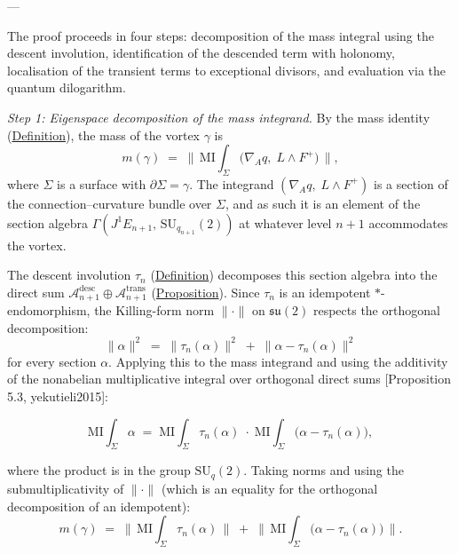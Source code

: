 \begin{theorem}
---

The proof proceeds in four steps: decomposition of the mass integral
using the descent involution, identification of the descended term with
holonomy, localisation of the transient terms to exceptional divisors,
and evaluation via the quantum dilogarithm.

\emph{Step 1: Eigenspace decomposition of the mass integrand.}
By the mass identity (\hyperref[def:mass-identity]{Definition}), the mass of
the vortex $\gamma$ is
\[
m(\gamma)
  \;=\;
  \bigl\lVert\,
  \mathrm{MI}\!\!\int_\Sigma
  \bigl(\nabla_A q,\; L \wedge F^+\bigr)
  \,\bigr\rVert,
\]
where $\Sigma$ is a surface with $\partial\Sigma = \gamma$.  The
integrand $(\nabla_A q,\; L \wedge F^+)$ is a section of the
connection--curvature bundle over $\Sigma$, and as such it is an element
of the section algebra $\Gamma(J^1 E_{n+1},\, \mathrm{SU}_{q_{n+1}}(2))$
at whatever level $n{+}1$ accommodates the vortex.

The descent involution $\tau_n$ (\hyperref[def:descent-involution]{Definition})
decomposes this section algebra into the direct sum
$\mathcal{A}_{n+1}^{\mathrm{desc}} \oplus \mathcal{A}_{n+1}^{\mathrm{trans}}$
(\hyperref[prop:descent-eigenspaces]{Proposition}).  Since $\tau_n$ is an
idempotent $*$-endomorphism, the Killing-form norm
$\lVert\cdot\rVert$ on $\mathfrak{su}(2)$ respects the orthogonal
decomposition:
\[
\lVert \alpha \rVert^2
  \;=\;
  \lVert \tau_n(\alpha) \rVert^2
  \;+\;
  \lVert \alpha - \tau_n(\alpha) \rVert^2
\]
for every section $\alpha$.  Applying this to the mass integrand and
using the additivity of the nonabelian multiplicative integral over
orthogonal direct sums [Proposition 5.3, yekutieli2015]:

\begin{equation}\label{eq:mi-decomp}
  \mathrm{MI}\!\!\int_\Sigma \alpha
  \;=\;
  \mathrm{MI}\!\!\int_\Sigma \tau_n(\alpha)
  \;\cdot\;
  \mathrm{MI}\!\!\int_\Sigma
  \bigl(\alpha - \tau_n(\alpha)\bigr),
\end{equation}

where the product is in the group $\mathrm{SU}_{q}(2)$.  Taking norms
and using the submultiplicativity of $\lVert\cdot\rVert$ (which is an
equality for the orthogonal decomposition of an idempotent):
\[
m(\gamma)
  \;=\;
  \bigl\lVert\,
  \mathrm{MI}\!\!\int_\Sigma \tau_n(\alpha)
  \,\bigr\rVert
  \;+\;
  \bigl\lVert\,
  \mathrm{MI}\!\!\int_\Sigma
  \bigl(\alpha - \tau_n(\alpha)\bigr)
  \,\bigr\rVert.
\]


\end{theorem}
